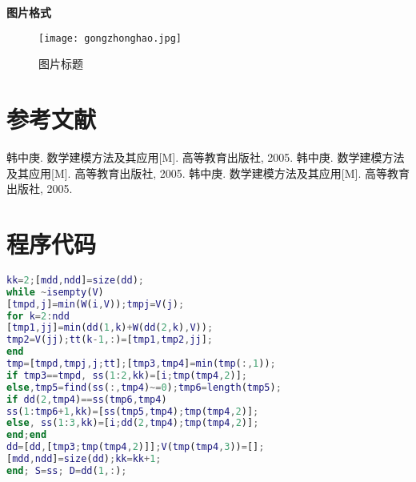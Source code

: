 \documentclass[bwprint]{gmcmthesis}
\begin{document}
\textbf{图片格式}
\begin{figure}[h]
    \centering
    \texttt{[image: gongzhonghao.jpg]}
    \caption{图片标题}
\end{figure}

\section{参考文献}
\begin{thebibliography}{1.2}%
    \setlength{\itemsep}{-2mm}
    韩中庚. 数学建模方法及其应用[M]. 高等教育出版社, 2005.
    韩中庚. 数学建模方法及其应用[M]. 高等教育出版社, 2005.
    韩中庚. 数学建模方法及其应用[M]. 高等教育出版社, 2005.
\end{thebibliography}

\newpage
\appendix
\section{程序代码}
\begin{lstlisting}[language=Matlab] 
kk=2;[mdd,ndd]=size(dd);
while ~isempty(V)
[tmpd,j]=min(W(i,V));tmpj=V(j);
for k=2:ndd
[tmp1,jj]=min(dd(1,k)+W(dd(2,k),V));
tmp2=V(jj);tt(k-1,:)=[tmp1,tmp2,jj];
end
tmp=[tmpd,tmpj,j;tt];[tmp3,tmp4]=min(tmp(:,1));
if tmp3==tmpd, ss(1:2,kk)=[i;tmp(tmp4,2)];
else,tmp5=find(ss(:,tmp4)~=0);tmp6=length(tmp5);
if dd(2,tmp4)==ss(tmp6,tmp4)
ss(1:tmp6+1,kk)=[ss(tmp5,tmp4);tmp(tmp4,2)];
else, ss(1:3,kk)=[i;dd(2,tmp4);tmp(tmp4,2)];
end;end
dd=[dd,[tmp3;tmp(tmp4,2)]];V(tmp(tmp4,3))=[];
[mdd,ndd]=size(dd);kk=kk+1;
end; S=ss; D=dd(1,:);
 \end{lstlisting}
\end{document}
